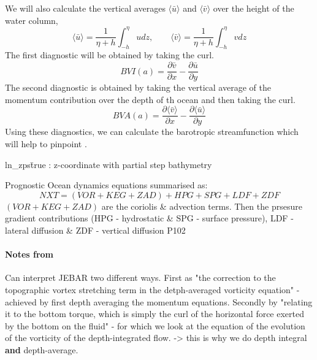 \documentclass[..\EOYR.tex]{subfiles}
\begin{document}
We will also calculate the vertical averages $\langle\bar{u}\rangle$ and $\langle\bar{v}\rangle$ over the height of the water column, 
\begin{equation}
	\langle\bar{u}\rangle = \frac{1}{\eta + h}\int_{-h}^{\eta}u dz ,\qquad \langle\bar{v}\rangle = \frac{1}{\eta + h}\int_{-h}^{\eta}v dz
\end{equation}
The first diagnostic will be obtained by taking  the curl.
\begin{equation}
	BVI(a) = \frac{\partial \bar{v}}{\partial x} - \frac{\partial \bar{u}}{\partial y}
\end{equation}
The second diagnostic is obtained by taking the vertical average of the momentum contribution over the depth  of th ocean and then taking  the curl. 
\begin{equation}
	BVA(a) = \frac{\partial \langle\bar{v}\rangle}{\partial x} - \frac{\partial \langle\bar{u}\rangle}{\partial y}
\end{equation}
	Using these diagnostics, we can calculate the barotropic  streamfunction which will help to pinpoint .

ln\_zps\=true : z-coordinate with partial step bathymetry


Prognostic Ocean dynamics equations summarised as:
\begin{equation}
    NXT = (VOR+KEG+ZAD)+HPG+SPG+LDF+ZDF
\end{equation}
    $(VOR+KEG+ZAD)$ are the coriolis \& advection terms. Then the prsesure gradient contributions (HPG - hydrostatic \& SPG - surface pressure), LDF - lateral diffusion \& ZDF - vertical diffusion
\citep{Madec2011} P102


\paragraph{Notes from \citep{Mertz1992}} Can interpret JEBAR two different ways. First as "the correction to the topographic vortex stretching term in the detph-averaged vorticity equation" - achieved by first depth averaging the momentum equations. Secondly by "relating it to the bottom torque, which is simply the curl of the horizontal force exerted by the bottom on the fluid" - for which we look at the equation of the evolution of the vorticity of the depth-integrated flow. -> this is why we do depth integral {\bf{and}} depth-average.
\end{document}
